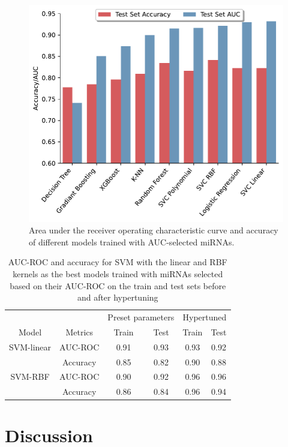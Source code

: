\documentclass[sn-mathphys,Numbered]{sn-jnl}%
\theoremstyle{thmstyleone}%
\theoremstyle{thmstyletwo}%
\theoremstyle{thmstylethree}%
\begin{document}
\begin{figure}
\centering 
\includegraphics[width=0.65\linewidth]{Models AUC 5 mirs CV}
\caption{Area under the receiver operating characteristic curve and accuracy of different models trained with AUC-selected miRNAs.}\label{fig:AUCmodels}
\end{figure}


\begin{table}
\centering
\caption{AUC-ROC and accuracy for SVM with the linear and RBF kernels as the best models trained with miRNAs selected based on their AUC-ROC on the train and test sets before and after hypertuning}
\label{tab:AUCML}
\begin{tabular}{cccccc}
\toprule
\multicolumn{2}{c}{} & \multicolumn{2}{c}{Preset parameters} & \multicolumn{2}{c}{Hypertuned} \\
\cmidrule(lr){3-4} \cmidrule(lr){5-6}
Model & Metrics & Train & Test & Train & Test\\
\midrule
SVM-linear & AUC-ROC & 0.91 & 0.93 & 0.93 & 0.92\\
& Accuracy & 0.85 & 0.82 & 0.90 & 0.88\\
SVM-RBF & AUC-ROC & 0.90 & 0.92 & 0.96 & 0.96\\
& Accuracy & 0.86 & 0.84 & 0.96 & 0.94\\
\bottomrule
\end{tabular}
\end{table}


\section{Discussion}\label{discussion}
\end{document}
